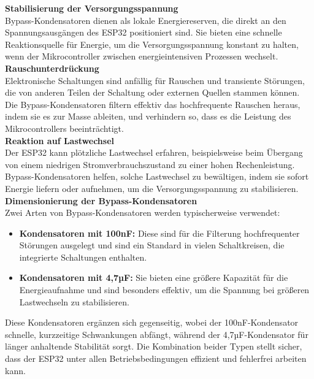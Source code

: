 \noindent \textbf{Stabilisierung der Versorgungsspannung}\\
\noindent Bypass-Kondensatoren dienen als lokale Energiereserven, die direkt an den Spannungsausgängen des ESP32 positioniert sind. Sie bieten eine schnelle Reaktionsquelle für Energie, um die Versorgungsspannung konstant zu halten, wenn der Mikrocontroller zwischen energieintensiven Prozessen wechselt.\\

\noindent \textbf{Rauschunterdrückung}\\
\noindent Elektronische Schaltungen sind anfällig für Rauschen und transiente Störungen, die von anderen Teilen der Schaltung oder externen Quellen stammen können. Die Bypass-Kondensatoren filtern effektiv das hochfrequente Rauschen heraus, indem sie es zur Masse ableiten, und verhindern so, dass es die Leistung des Mikrocontrollers beeinträchtigt.\\

\noindent \textbf{Reaktion auf Lastwechsel}\\
\noindent Der ESP32 kann plötzliche Lastwechsel erfahren, beispielsweise beim Übergang von einem niedrigen Stromverbrauchszustand zu einer hohen Rechenleistung. Bypass-Kondensatoren helfen, solche Lastwechsel zu bewältigen, indem sie sofort Energie liefern oder aufnehmen, um die Versorgungsspannung zu stabilisieren.\\

\noindent \textbf{Dimensionierung der Bypass-Kondensatoren}\\
\noindent Zwei Arten von Bypass-Kondensatoren werden typischerweise verwendet:
\begin{itemize}
  \item \textbf{Kondensatoren mit 100nF:} Diese sind für die Filterung hochfrequenter Störungen ausgelegt und sind ein Standard in vielen Schaltkreisen, die integrierte Schaltungen enthalten.
  \item \textbf{Kondensatoren mit 4,7µF:} Sie bieten eine größere Kapazität für die Energieaufnahme und sind besonders effektiv, um die Spannung bei größeren Lastwechseln zu stabilisieren.
\end{itemize}

\noindent Diese Kondensatoren ergänzen sich gegenseitig, wobei der 100nF-Kondensator schnelle, kurzzeitige Schwankungen abfängt, während der 4,7µF-Kondensator für länger anhaltende Stabilität sorgt. Die Kombination beider Typen stellt sicher, dass der ESP32 unter allen Betriebsbedingungen effizient und fehlerfrei arbeiten kann.



